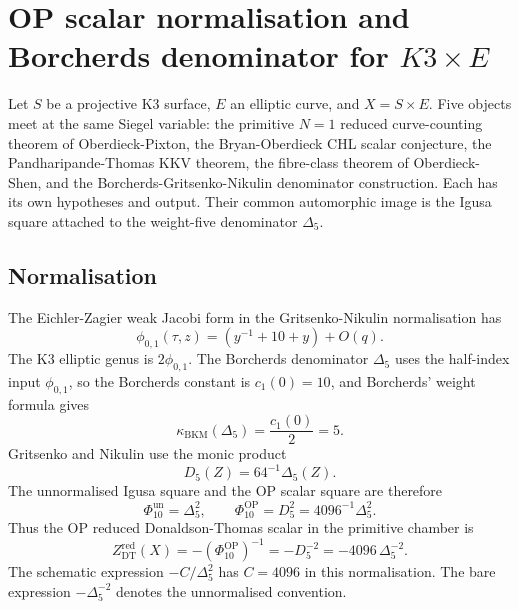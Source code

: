 \providecommand{\kBKM}{\kappa_{\mathrm{BKM}}}
\providecommand{\kch}{\kappa_{\mathrm{ch}}}
\providecommand{\kcat}{\kappa_{\mathrm{cat}}}
\providecommand{\kfib}{\kappa_{\mathrm{fiber}}}
\providecommand{\Z}{\mathbb{Z}}
\providecommand{\DTred}{Z^{\mathrm{red}}_{\mathrm{DT}}}
\providecommand{\GWred}{Z^{\mathrm{red}}_{\mathrm{GW}}}
\providecommand{\PTred}{Z^{\mathrm{red}}_{\mathrm{PT}}}
\providecommand{\Dfive}{D_5}
\providecommand{\DeltaFive}{\Delta_5}
\providecommand{\PhiTenUn}{\Phi_{10}^{\mathrm{un}}}
\providecommand{\PhiTenOP}{\Phi_{10}^{\mathrm{OP}}}
\providecommand{\chiTen}{\chi_{10}}
\providecommand{\phizo}{\phi_{0,1}}
\providecommand{\gDelta}{\mathfrak{g}_{\Delta_5}}

\section*{OP scalar normalisation and Borcherds denominator for \(K3\times E\)}

Let \(S\) be a projective K3 surface, \(E\) an elliptic curve, and
\(X=S\times E\). Five objects meet at the same Siegel variable:
the primitive \(N=1\) reduced curve-counting theorem of
Oberdieck-Pixton, the Bryan-Oberdieck CHL scalar conjecture, the
Pandharipande-Thomas KKV theorem, the fibre-class theorem of
Oberdieck-Shen, and the Borcherds-Gritsenko-Nikulin denominator
construction. Each has its own hypotheses and output. Their common
automorphic image is the Igusa square attached to the weight-five
denominator \(\DeltaFive\).

\subsection*{Normalisation}

The Eichler-Zagier weak Jacobi form in the Gritsenko-Nikulin
normalisation has
\[
  \phizo(\tau,z)
  =
  (y^{-1}+10+y)+O(q).
\]
The K3 elliptic genus is \(2\phizo\). The Borcherds denominator
\(\DeltaFive\) uses the half-index input \(\phizo\), so the Borcherds
constant is \(c_1(0)=10\), and Borcherds' weight formula gives
\[
  \kBKM(\DeltaFive)=\frac{c_1(0)}{2}=5.
\]
Gritsenko and Nikulin use the monic product
\[
  \Dfive(Z)=64^{-1}\DeltaFive(Z).
\]
The unnormalised Igusa square and the OP scalar square are therefore
\[
  \PhiTenUn=\DeltaFive^2,\qquad
  \PhiTenOP=\Dfive^2=4096^{-1}\DeltaFive^2.
\]
Thus the OP reduced Donaldson-Thomas scalar in the primitive chamber is
\[
  \DTred(X)
  =
  -(\PhiTenOP)^{-1}
  =
  -\Dfive^{-2}
  =
  -4096\,\DeltaFive^{-2}.
\]
The schematic expression \(-C/\DeltaFive^2\) has \(C=4096\) in this
normalisation. The bare expression \(-\DeltaFive^{-2}\) denotes the
unnormalised convention.

